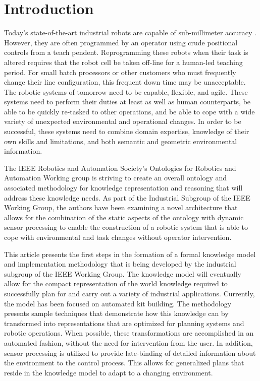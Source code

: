 \documentclass[preprint,12pt]{elsarticle}
\begin{document}

\section{Introduction}
\label{sect:introduction}
Today's state-of-the-art industrial robots are capable of sub-millimeter accuracy \cite{RobotAccuracy}.
However, they are often programmed by an operator using crude positional controls from a teach pendent. 
Reprogramming these robots when their task is altered requires that the robot cell be taken off-line for a
human-led teaching period.  For small batch processors or other customers who must frequently change
their line configuration, this frequent down time may be unacceptable. 
The robotic systems of tomorrow
need to be capable, flexible, and agile.  These systems need to perform their duties at least 
as well as human counterparts, be able to be quickly re-tasked to other operations,
and be able to cope with a wide variety of unexpected environmental and operational changes. 
In order to be successful, these systems need to combine domain expertise,
knowledge of their own skills and limitations, and both semantic and geometric environmental information.

The IEEE Robotics and Automation Society's Ontologies for Robotics and Automation Working group is 
striving to create an overall ontology and
associated methodology for knowledge representation and reasoning that will address these 
knowledge needs. As part of the
Industrial Subgroup of the IEEE Working Group, the authors have been examining a novel 
architecture that allows for the combination of the static
aspects of the ontology with dynamic sensor processing to enable the construction of a robotic system that 
is able to cope with environmental and task changes
without operator intervention.

This article presents the first steps in the formation of a formal knowledge model and implementation methodology
that is being developed by the industrial subgroup
of the IEEE Working Group. The knowledge model will eventually allow for the compact representation
of the world knowledge required to successfully plan for and carry out a variety of industrial applications. Currently,
the model has been focused on automated kit building.
The methodology presents sample techniques that demonstrate how this knowledge can by transformed
into representations that are optimized for planning systems and robotic operations. When possible,
these transformations are accomplished in an automated fashion, without the need for intervention from
the user. In addition, sensor processing is utilized to provide late-binding of detailed information
about the environment to the control process. This allows for generalized plans that reside in the knowledge
model to adapt to a changing environment.
\end{document}
